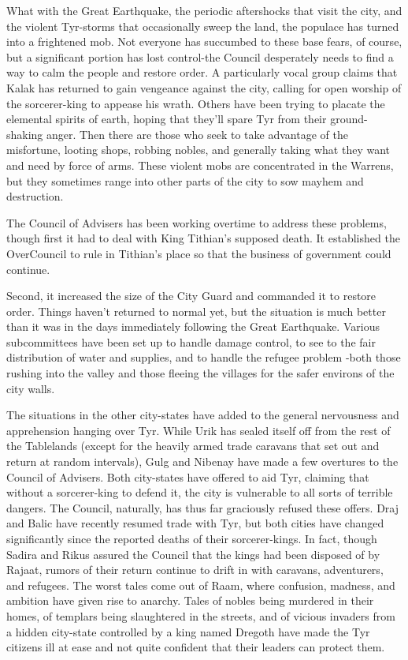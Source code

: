 {	What with the Great Earthquake, the periodic aftershocks that visit the city, and the violent Tyr-storms that occasionally sweep the land, the populace has turned into a frightened mob. Not everyone has succumbed to these base fears, of course, but a significant portion has lost control-the Council desperately needs to find a way to calm the people and restore order. A particularly vocal group claims that Kalak has returned to gain vengeance against the city, calling for open worship of the sorcerer-king to appease his wrath. Others have been trying to placate the elemental spirits of earth, hoping that they'll spare Tyr from their ground-shaking anger. Then there are those who seek to take advantage of the misfortune, looting shops, robbing nobles, and generally taking what they want and need by force of arms. These violent mobs are concentrated in the Warrens, but they sometimes range into other parts of the city to sow mayhem and destruction.

	The Council of Advisers has been working overtime to address these problems, though first it had to deal with King Tithian's supposed death. It established the OverCouncil to rule in Tithian's place so that the business of government could continue.

	Second, it increased the size of the City Guard and commanded it to restore order. Things haven't returned to normal yet, but the situation is much better than it was in the days immediately following the Great Earthquake. Various subcommittees have been set up to handle damage control, to see to the fair distribution of water and supplies, and to handle the refugee problem -both those rushing into the valley and those fleeing the villages for the safer environs of the city walls.

	The situations in the other city-states have added to the general nervousness and apprehension hanging over Tyr. While Urik has sealed itself off from the rest of the Tablelands (except for the heavily armed trade caravans that set out and return at random intervals), Gulg and Nibenay have made a few overtures to the Council of Advisers. Both city-states have offered to aid Tyr, claiming that without a sorcerer-king to defend it, the city is vulnerable to all sorts of terrible dangers. The Council, naturally, has thus far graciously refused these offers. Draj and Balic have recently resumed trade with Tyr, but both cities have changed significantly since the reported deaths of their sorcerer-kings. In fact, though Sadira and Rikus assured the Council that the kings had been disposed of by Rajaat, rumors of their return continue to drift in with caravans, adventurers, and refugees. The worst tales come out of Raam, where confusion, madness, and ambition have given rise to anarchy. Tales of nobles being murdered in their homes, of templars being slaughtered in the streets, and of vicious invaders from a hidden city-state controlled by a king named Dregoth have made the Tyr citizens ill at ease and not quite confident that their leaders can protect them.

}
